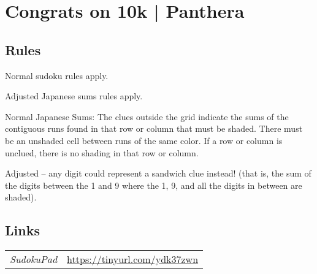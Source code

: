 \section[Congrats on 10k | Panthera (\emph{JSS/Sandwich})]{Congrats on 10k | {\normalfont Panthera}}
\label{sec:21-congrats-on-10k-panthera}

\subsection*{Rules}
\begin{markdown}
Normal sudoku rules apply.

Adjusted Japanese sums rules apply.



Normal Japanese Sums: The clues outside the grid indicate the sums of the contiguous runs found in that row or column that must be shaded. There must be an unshaded cell between runs of the same color. If a row or column is unclued, there is no shading in that row or column.



Adjusted -- any digit could represent a sandwich clue instead! (that is, the sum of the digits between the 1 and 9 where the 1, 9, and all the digits in between are shaded). 
\end{markdown}
\subsection*{Links}
\begin{tabularx}{\textwidth}{l X}
\emph{SudokuPad} & \url{https://tinyurl.com/ydk37zwn} \\
\end{tabularx}
\pagebreak
